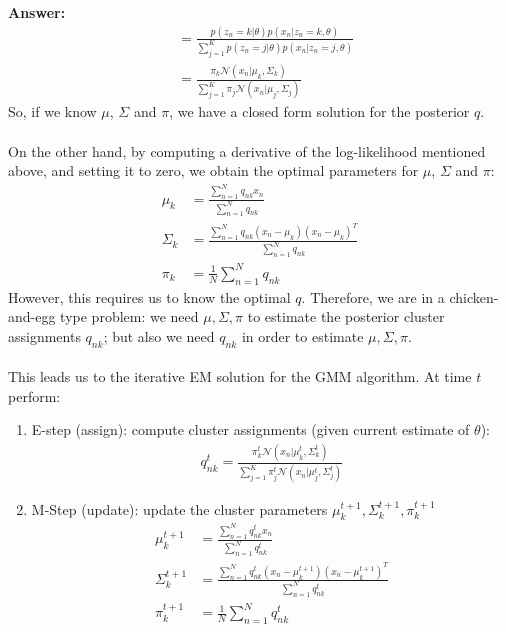 \documentclass{article}
\newenvironment{QandA}{\begin{enumerate}[label=\arabic*.]}{\end{enumerate}}
\newenvironment{InnerQandA}{\begin{enumerate}[label=\roman*.]}{\end{enumerate}}
\newenvironment{answer}{\par\normalfont \textbf{Answer:}}{}
\newcommand{\g}{\vert}
\begin{document}
\begin{QandA}
\begin{InnerQandA}
\begin{answer}
\begin{align*}
                &= \frac{p(z_n=k \g \theta)p(x_n \g z_n = k, \theta)}{\sum_{j=1}^K p(z_n=j \g \theta)p(x_n \g z_n = j, \theta)} \\
                &= \frac{\pi_k \mathcal{N}(x_n \g \mu_k, \Sigma_k)}{\sum_{j=1}^K \pi_j \mathcal{N}(x_n \g \mu_j, \Sigma_j)}
            \end{align*}
            So, if we know $\mu$, $\Sigma$ and $\pi$, we have a closed form solution for the posterior $q$. \\\\
            On the other hand, by computing a derivative of the log-likelihood mentioned above, and setting it to zero, we obtain the optimal parameters for $\mu$, $\Sigma$ and $\pi$:
            \begin{align*}
                \mu_k &= \frac{\sum_{n=1}^N q_{nk} x_n}{\sum_{n=1}^N q_{nk}}\\
                \Sigma_k &= \frac{\sum_{n=1}^N q_{nk}(x_n - \mu_k)(x_n - \mu_k)^T}{\sum_{n=1}^N q_{nk}} \\
                \pi_k &= \frac{1}{N}\sum_{n=1}^N q_{nk}
            \end{align*}
            However, this requires us to know the optimal $q$. Therefore, we are in a chicken-and-egg type problem: we need $\mu, \Sigma, \pi$ to estimate the posterior cluster assignments $q_{nk}$; but also we need $q_{nk}$ in order to estimate $\mu, \Sigma, \pi$. \\\\
            This leads us to the iterative EM solution for the GMM algorithm. At time $t$ perform:
            \begin{enumerate}[label=\arabic*.]
                \item E-step (assign): compute cluster assignments (given current estimate of $\theta$):
                \begin{align*}
                    q_{nk}^t = \frac{\pi_k^t \mathcal{N}(x_n \g \mu_k^t, \Sigma_k^t)}{\sum_{j=1}^K \pi_j^t \mathcal{N}(x_n \g \mu_j^t, \Sigma_j^t)}
                \end{align*}
                \item M-Step (update): update the cluster parameters $\mu_k^{t+1}, \Sigma_{k}^{t+1}, \pi_k^{t+1}$
                \begin{align*}
                \mu_k^{t+1} &= \frac{\sum_{n=1}^N q_{nk}^t x_n}{\sum_{n=1}^N q_{nk}^t}\\
                \Sigma_k^{t+1} &= \frac{\sum_{n=1}^N q_{nk}^t(x_n - \mu_k^{t+1})(x_n - \mu_k^{t+1})^T}{\sum_{n=1}^N q_{nk}^t} \\
                \pi_k^{t+1} &= \frac{1}{N}\sum_{n=1}^N q_{nk}^t
            \end{align*}
            \end{enumerate}


\end{answer}
\end{InnerQandA}
\end{QandA}
\end{document}

